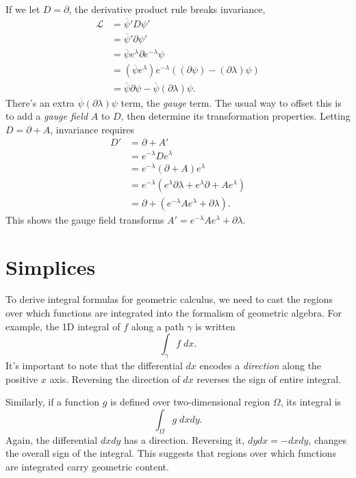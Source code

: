 	If we let $D = \partial$, the derivative product rule breaks invariance,	
	\begin{align*}
	\mathcal{L} &= \overline{\psi}' D \psi' \\
	&= \overline{\psi}' \partial \psi' \\
	&= \overline{\psi}e^{\lambda} \partial e^{-\lambda}\psi \\
	&= \left(\overline{\psi}e^{\lambda}\right) e^{-\lambda}\left(\left(\partial\psi\right) - \left(\partial\lambda\right)\psi\right) \\
	&= \overline{\psi}\partial\psi - \overline{\psi}\left(\partial\lambda\right)\psi.
	\end{align*} 	
	There's an extra $\overline{\psi}\left(\partial\lambda\right)\psi$ term, the \emph{gauge} term. The usual way to offset this is to add a \emph{gauge field} $A$ to $D$, then determine its transformation properties. Letting $D = \partial + A$, invariance requires	
	\begin{align*}
	D' &= \partial + A' \\
	&= e^{-\lambda}De^{\lambda}\\
	&=e^{-\lambda}\left(\partial + A\right)e^{\lambda} \\
	&= e^{-\lambda}\left(e^{\lambda}\partial\lambda + e^{\lambda}\partial + Ae^{\lambda}\right)\\
	&= \partial + \left(e^{-\lambda}Ae^{\lambda}+\partial\lambda\right).
	\end{align*}	
	This shows the gauge field transforms $A' = e^{-\lambda}Ae^{\lambda}+\partial\lambda.$
	
	\section{Simplices}
	
	To derive integral formulas for geometric calculus, we need to cast the regions over which functions are integrated into the formalism of geometric algebra. For example, the 1D integral of $f$ along a path $\gamma$ is written
	\[
	\int_\gamma f\;dx.
	\]
	It's important to note that the differential $dx$ encodes a \emph{direction} along the positive $x$ axis. Reversing the direction of $dx$ reverses the sign of entire integral.
	
	Similarly, if a function $g$ is defined over two-dimensional region $\Omega$, its integral is
	\[
	\int_\Omega g\;dxdy.
	\]
	Again, the differential $dxdy$ has a direction. Reversing it, $dydx = -dxdy$, changes the overall sign of the integral. This suggests that regions over which functions are integrated carry geometric content.
	
